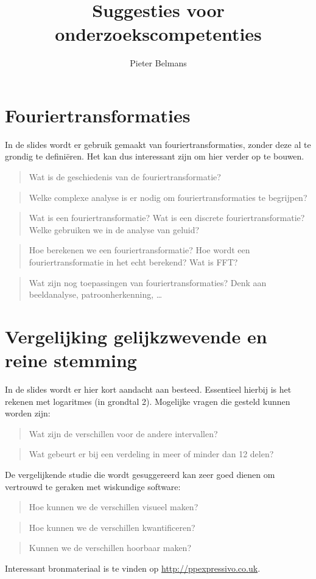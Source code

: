 \documentclass[10pt,a4paper]{article}
\title{Suggesties voor onderzoekscompetenties}
\author{Pieter Belmans}
\begin{document}
\maketitle

\section{Fouriertransformaties}
In de slides wordt er gebruik gemaakt van fouriertransformaties, zonder deze al te grondig te defini\"eren. Het kan dus interessant zijn om hier verder op te bouwen.
\begin{quote}
  Wat is de geschiedenis van de fouriertransformatie?
\end{quote}
\begin{quote}
  Welke complexe analyse is er nodig om fouriertransformaties te begrijpen?
\end{quote}
\begin{quote}
  Wat is een fouriertransformatie? Wat is een discrete fouriertransformatie? Welke gebruiken we in de analyse van geluid?
\end{quote}
\begin{quote}
  Hoe berekenen we een fouriertransformatie? Hoe wordt een fouriertransformatie in het echt berekend? Wat is FFT?
\end{quote}
\begin{quote}
  Wat zijn nog toepassingen van fouriertransformaties? Denk aan beeldanalyse, patroonherkenning, \dots
\end{quote}


\section{Vergelijking gelijkzwevende en reine stemming}
In de slides wordt er hier kort aandacht aan besteed. Essentieel hierbij is het rekenen met logaritmes (in grondtal 2). Mogelijke vragen die gesteld kunnen worden zijn:
\begin{quote}
  Wat zijn de verschillen voor de andere intervallen?
\end{quote}
\begin{quote}
  Wat gebeurt er bij een verdeling in meer of minder dan 12 delen?
\end{quote}
De vergelijkende studie die wordt gesuggereerd kan zeer goed dienen om vertrouwd te geraken met wiskundige software:
\begin{quote}
  Hoe kunnen we de verschillen visueel maken?
\end{quote}
\begin{quote}
  Hoe kunnen we de verschillen kwantificeren?
\end{quote}
\begin{quote}
  Kunnen we de verschillen hoorbaar maken?
\end{quote}
Interessant bronmateriaal is te vinden op \url{http://ppexpressivo.co.uk}.
\end{document}
